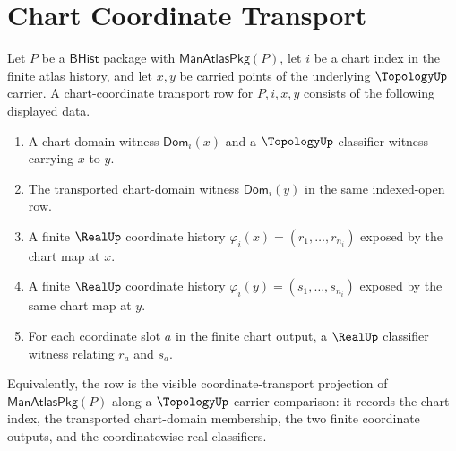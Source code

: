 \section{Chart Coordinate Transport}
\label{sec:manifold-coordinate-transport}

\begin{definition}
\label{def:manifoldup-chart-coordinate-transport-row}
Let $P$ be a $\mathsf{BHist}$ package with $\mathsf{ManAtlasPkg}(P)$, let
$i$ be a chart index in the finite atlas history, and let $x,y$ be carried
points of the underlying $\TopologyUp$ carrier. A chart-coordinate transport
row for $P,i,x,y$ consists of the following displayed data.
\begin{enumerate}
\item A chart-domain witness $\mathsf{Dom}_i(x)$ and a $\TopologyUp$
classifier witness carrying $x$ to $y$.
\item The transported chart-domain witness $\mathsf{Dom}_i(y)$ in the same
indexed-open row.
\item A finite $\RealUp$ coordinate history
$\varphi_i(x)=(r_1,\ldots,r_{n_i})$ exposed by the chart map at $x$.
\item A finite $\RealUp$ coordinate history
$\varphi_i(y)=(s_1,\ldots,s_{n_i})$ exposed by the same chart map at $y$.
\item For each coordinate slot $a$ in the finite chart output, a
$\RealUp$ classifier witness relating $r_a$ and $s_a$.
\end{enumerate}
Equivalently, the row is the visible coordinate-transport projection of
$\mathsf{ManAtlasPkg}(P)$ along a $\TopologyUp$ carrier comparison: it records
the chart index, the transported chart-domain membership, the two finite
coordinate outputs, and the coordinatewise real classifiers.
\end{definition}

